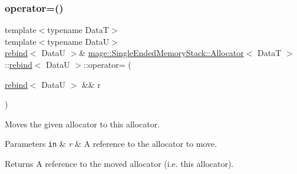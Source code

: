 \subsubsection{\texorpdfstring{operator=()}{operator=()}\hspace{0.1cm}{\footnotesize\ttfamily [2/2]}}
{\footnotesize\ttfamily template$<$typename DataT$>$ \\
template$<$typename DataU$>$ \\
\hyperlink{structmage_1_1_single_ended_memory_stack_1_1_allocator_1_1rebind}{rebind}$<$ DataU $>$\& \hyperlink{structmage_1_1_single_ended_memory_stack_1_1_allocator}{mage\+::\+Single\+Ended\+Memory\+Stack\+::\+Allocator}$<$ DataT $>$\+::\hyperlink{structmage_1_1_single_ended_memory_stack_1_1_allocator_1_1rebind}{rebind}$<$ DataU $>$\+::operator= (\begin{DoxyParamCaption}\item[{\hyperlink{structmage_1_1_single_ended_memory_stack_1_1_allocator_1_1rebind}{rebind}$<$ DataU $>$ \&\&}]{r }\end{DoxyParamCaption})\hspace{0.3cm}{\ttfamily [delete]}}

Moves the given allocator to this allocator.


\begin{DoxyParams}[1]{Parameters}
\mbox{\tt in}  & {\em r} & A reference to the allocator to move. \\
\hline
\end{DoxyParams}
\begin{DoxyReturn}{Returns}
A reference to the moved allocator (i.\+e. this allocator). 
\end{DoxyReturn}
